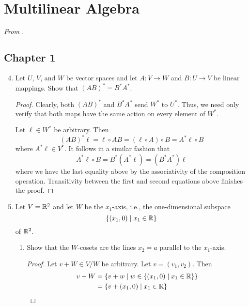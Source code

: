 \documentclass[../psets.tex]{subfiles}
\begin{document}
\section{Multilinear Algebra}
\emph{From \textcite{bib:DifferentialForms}.}
\subsection*{Chapter 1}
\begin{enumerate}[label={\textbf{1.2.\roman*.}}]
    \setcounter{enumi}{3}
    \item Let $U$, $V$, and $W$ be vector spaces and let $A:V\to W$ and $B:U\to V$ be linear mappings. Show that $(AB)^*=B^*A^*$.
    \begin{proof}
        Clearly, both $(AB)^*$ and $B^*A^*$ send $W^*$ to $U^*$. Thus, we need only verify that both maps have the same action on every element of $W^*$.\par
        Let $\ell\in W^*$ be arbitrary. Then
        \begin{equation*}
            (AB)^*\ell = \ell\circ AB
            = (\ell\circ A)\circ B
            = A^*\ell\circ B
        \end{equation*}
        where $A^*\ell\in V^*$. It follows in a similar fashion that
        \begin{equation*}
            A^*\ell\circ B = B^*(A^*\ell)
            = (B^*A^*)\ell
        \end{equation*}
        where we have the last equality above by the associativity of the composition operation. Transitivity between the first and second equations above finishes the proof.
    \end{proof}
    \item Let $V=\mathbb{R}^2$ and let $W$ be the $x_1$-axis, i.e., the one-dimensional subspace
    \begin{equation*}
        \{(x_1,0)\mid x_1\in\mathbb{R}\}
    \end{equation*}
    of $\mathbb{R}^2$.
    \begin{enumerate}
        \item Show that the $W$-cosets are the lines $x_2=a$ parallel to the $x_1$-axis.
        \begin{proof}
            Let $v+W\in V/W$ be arbitrary. Let $v=(v_1,v_2)$. Then
            \begin{align*}
                v+W &= \{v+w\mid w\in\{(x_1,0)\mid x_1\in\R\}\}\\
                &= \{v+(x_1,0)\mid x_1\in\R\}\\

\end{align*}
\end{proof}
\end{enumerate}
\end{enumerate}
\end{document}
